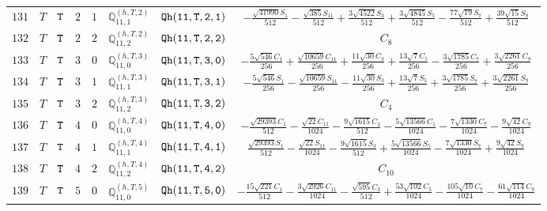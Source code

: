 \documentclass[fleqn,8pt]{jsarticle}
\begin{document}
\begin{table}[ht!]
\begin{center}
\begin{tabular}{cccccccc}
$ 131 $ & $ T $ & $ {\tt T} $ & $ 2 $ & $ 1 $ & $ \mathbb{Q}_{11,1}^{(h,T,2)} $ & $ {\tt Qh(11,T,2,1)} $ & $ - \frac{\sqrt{41990} S_{1}}{512} - \frac{\sqrt{385} S_{11}}{512} + \frac{3 \sqrt{4522} S_{3}}{512} + \frac{3 \sqrt{4845} S_{5}}{512} - \frac{77 \sqrt{19} S_{7}}{512} + \frac{39 \sqrt{15} S_{9}}{512} $ \\
$ 132 $ & $ T $ & $ {\tt T} $ & $ 2 $ & $ 2 $ & $ \mathbb{Q}_{11,2}^{(h,T,2)} $ & $ {\tt Qh(11,T,2,2)} $ & $ C_{8} $ \\
$ 133 $ & $ T $ & $ {\tt T} $ & $ 3 $ & $ 0 $ & $ \mathbb{Q}_{11,0}^{(h,T,3)} $ & $ {\tt Qh(11,T,3,0)} $ & $ - \frac{5 \sqrt{546} C_{1}}{256} + \frac{\sqrt{10659} C_{11}}{256} + \frac{11 \sqrt{30} C_{3}}{256} + \frac{13 \sqrt{7} C_{5}}{256} - \frac{3 \sqrt{1785} C_{7}}{256} + \frac{3 \sqrt{2261} C_{9}}{256} $ \\
$ 134 $ & $ T $ & $ {\tt T} $ & $ 3 $ & $ 1 $ & $ \mathbb{Q}_{11,1}^{(h,T,3)} $ & $ {\tt Qh(11,T,3,1)} $ & $ - \frac{5 \sqrt{546} S_{1}}{256} - \frac{\sqrt{10659} S_{11}}{256} - \frac{11 \sqrt{30} S_{3}}{256} + \frac{13 \sqrt{7} S_{5}}{256} + \frac{3 \sqrt{1785} S_{7}}{256} + \frac{3 \sqrt{2261} S_{9}}{256} $ \\
$ 135 $ & $ T $ & $ {\tt T} $ & $ 3 $ & $ 2 $ & $ \mathbb{Q}_{11,2}^{(h,T,3)} $ & $ {\tt Qh(11,T,3,2)} $ & $ C_{4} $ \\
$ 136 $ & $ T $ & $ {\tt T} $ & $ 4 $ & $ 0 $ & $ \mathbb{Q}_{11,0}^{(h,T,4)} $ & $ {\tt Qh(11,T,4,0)} $ & $ - \frac{\sqrt{29393} C_{1}}{512} - \frac{\sqrt{22} C_{11}}{1024} - \frac{9 \sqrt{1615} C_{3}}{512} - \frac{5 \sqrt{13566} C_{5}}{1024} - \frac{7 \sqrt{1330} C_{7}}{1024} - \frac{9 \sqrt{42} C_{9}}{1024} $ \\
$ 137 $ & $ T $ & $ {\tt T} $ & $ 4 $ & $ 1 $ & $ \mathbb{Q}_{11,1}^{(h,T,4)} $ & $ {\tt Qh(11,T,4,1)} $ & $ \frac{\sqrt{29393} S_{1}}{512} - \frac{\sqrt{22} S_{11}}{1024} - \frac{9 \sqrt{1615} S_{3}}{512} + \frac{5 \sqrt{13566} S_{5}}{1024} - \frac{7 \sqrt{1330} S_{7}}{1024} + \frac{9 \sqrt{42} S_{9}}{1024} $ \\
$ 138 $ & $ T $ & $ {\tt T} $ & $ 4 $ & $ 2 $ & $ \mathbb{Q}_{11,2}^{(h,T,4)} $ & $ {\tt Qh(11,T,4,2)} $ & $ C_{10} $ \\
$ 139 $ & $ T $ & $ {\tt T} $ & $ 5 $ & $ 0 $ & $ \mathbb{Q}_{11,0}^{(h,T,5)} $ & $ {\tt Qh(11,T,5,0)} $ & $ - \frac{15 \sqrt{221} C_{1}}{512} - \frac{3 \sqrt{2926} C_{11}}{1024} - \frac{\sqrt{595} C_{3}}{512} + \frac{53 \sqrt{102} C_{5}}{1024} - \frac{105 \sqrt{10} C_{7}}{1024} - \frac{61 \sqrt{114} C_{9}}{1024} $ \\

\end{tabular}
\end{center}
\end{table}
\end{document}
